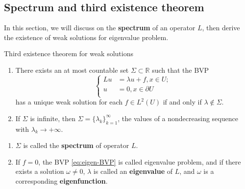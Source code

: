 \subsection{Spectrum and third existence theorem}
In this section, we will discuss on the \textbf{spectrum} of an operator $L$, then derive the existence of weak solutions for eigenvalue problem.
\begin{theorem}{Third existence theorem for weak solutions}
    \begin{enumerate}
        \item There exists an at most countable set $\Sigma\subset\mathbb{R}$ such that the BVP 
        \begin{equation}
            \label{eq:eigen-BVP}
            \left\{
                \begin{aligned}
                    Lu&=\lambda u+f,x\in U;\\
                    u&=0,x\in\partial U\\
                \end{aligned}
            \right.
        \end{equation}
        has a unique weak solution for each $f\in L^{2}(U)$ if and only if $\lambda\notin\Sigma$.
        \item If $\Sigma$ is infinite, then $\Sigma=\{\lambda_{k}\}_{k=1}^{\infty}$, the values of a nondecreasing sequence with $\lambda_{k}\rightarrow+\infty$.
    \end{enumerate}
\end{theorem}
\begin{remark}
    \begin{enumerate}
        \item $\Sigma$ is called the \textbf{spectrum} of operator $L$.
        \item If $f=0$, the BVP \eqref{eq:eigen-BVP} is called eigenvalue problem, and if there exists a solution $\omega\neq 0$, $\lambda$ is called an \textbf{eigenvalue} of $L$, and $\omega$ is a corresponding \textbf{eigenfunction}. 
    \end{enumerate}
\end{remark}
